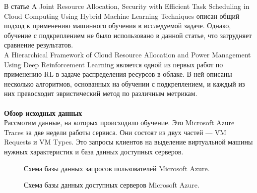 \documentclass{article}
\begin{document}
В статье A Joint Resource Allocation, Security with Efficient Task Scheduling in Cloud Computing Using Hybrid Machine Learning Techniques\cite{litlink23} описан общий подход к применению машинного обучения в исследуемой задаче. Однако, обучение с подкреплением не было использовано в данной статье, что затрудняет сравнение результатов.\\
A Hierarchical Framework of Cloud Resource Allocation and Power Management Using Deep Reinforcement Learning\cite{litlink24} является одной из первых работ по применению RL в задаче распределения ресурсов в облаке. В ней описаны несколько алгоритмов, основанных на обучении с подкреплением, и каждый из них превосходит эвристический метод по различным метрикам.\\~\\
\textbf{Обзор исходных данных}\\
Рассмотим данные, на которых происходило обучение. Это Microsoft Azure Traces за две недели работы сервиса. Они состоят из двух частей — VM Requests и VM Types. Это запросы клиентов на выделение виртуальной машины нужных характеристик и база данных доступных серверов. 
\begin{figure}[h]
\caption{Схема базы данных запросов пользователей Microsoft Azure\cite{litlink22}.}
\label{ris:image}
\end{figure}
\begin{figure}[h]
\caption{Схема базы данных доступных серверов Microsoft Azure\cite{litlink22}.}
\label{ris:image}
\end{figure}\\
\end{document}

